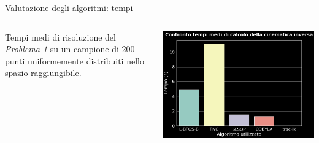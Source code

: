 \begin{frame}{Valutazione degli algoritmi: tempi}
\begin{columns}
\begin{column}{0.3\textwidth}
Tempi medi di risoluzione del \emph{Problema 1} su un campione di 200 punti uniformemente distribuiti nello spazio raggiungibile.
\end{column}
\begin{column}{0.7\textwidth}
\includegraphics[width=\textwidth]{slide/img_cinematica_inversa/risultati_tempi.png}
\end{column}
\end{columns}

\end{frame}

